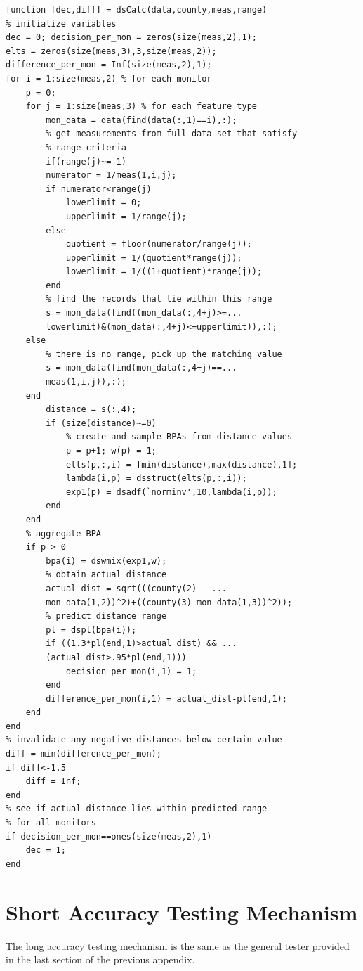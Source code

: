 \documentclass[12pt]{uthesis-v12}  %
\begin{document}
\begin{verbatim}
function [dec,diff] = dsCalc(data,county,meas,range)
% initialize variables
dec = 0; decision_per_mon = zeros(size(meas,2),1); 
elts = zeros(size(meas,3),3,size(meas,2)); 
difference_per_mon = Inf(size(meas,2),1);
for i = 1:size(meas,2) % for each monitor
    p = 0;
    for j = 1:size(meas,3) % for each feature type
        mon_data = data(find(data(:,1)==i),:);
        % get measurements from full data set that satisfy
        % range criteria
        if(range(j)~=-1)
        numerator = 1/meas(1,i,j);
        if numerator<range(j)
            lowerlimit = 0;
            upperlimit = 1/range(j);
        else
            quotient = floor(numerator/range(j));
            upperlimit = 1/(quotient*range(j));        
            lowerlimit = 1/((1+quotient)*range(j));
        end
        % find the records that lie within this range
        s = mon_data(find((mon_data(:,4+j)>=...
        lowerlimit)&(mon_data(:,4+j)<=upperlimit)),:);
    else
        % there is no range, pick up the matching value
        s = mon_data(find(mon_data(:,4+j)==...
        meas(1,i,j)),:);
    end
        distance = s(:,4);
        if (size(distance)~=0)
            % create and sample BPAs from distance values
            p = p+1; w(p) = 1;
            elts(p,:,i) = [min(distance),max(distance),1];
            lambda(i,p) = dsstruct(elts(p,:,i));
            exp1(p) = dsadf(`norminv',10,lambda(i,p));
        end
    end
    % aggregate BPA
    if p > 0
        bpa(i) = dswmix(exp1,w);
        % obtain actual distance
        actual_dist = sqrt(((county(2) - ...
        mon_data(1,2))^2)+((county(3)-mon_data(1,3))^2));
        % predict distance range
        pl = dspl(bpa(i));
        if ((1.3*pl(end,1)>actual_dist) && ...
        (actual_dist>.95*pl(end,1)))
            decision_per_mon(i,1) = 1;
        end
        difference_per_mon(i,1) = actual_dist-pl(end,1);
    end
end
% invalidate any negative distances below certain value
diff = min(difference_per_mon);
if diff<-1.5
    diff = Inf;
end
% see if actual distance lies within predicted range
% for all monitors
if decision_per_mon==ones(size(meas,2),1)
    dec = 1;
end
\end{verbatim}

\section{Short Accuracy Testing Mechanism}

 The long accuracy testing mechanism is the same as the general tester provided in the last section of the previous appendix.
\end{document}
